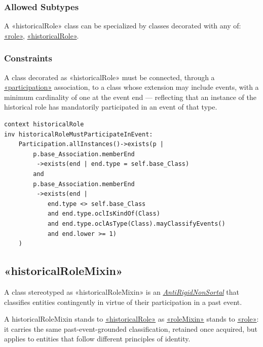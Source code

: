 \subsubsection{Allowed Subtypes}

A «historicalRole» class can be specialized by classes decorated with any of:
\hyperref[stereotype:role]{«role»}, \hyperref[stereotype:historicalRole]{«historicalRole»}.


\subsubsection{Constraints}

\begin{constraint}
\label{constraint:historicalRoleMustParticipateInEvent}

A class decorated as «historicalRole» must be connected, through a \hyperref[stereotype:participation]{«participation»} association, to a class whose extension may include events, with a minimum cardinality of one at the event end --- reflecting that an instance of the historical role has mandatorily participated in an event of that type.

\begin{lstlisting}[language=OCL]
context historicalRole 
inv historicalRoleMustParticipateInEvent:
    Participation.allInstances()->exists(p |
        p.base_Association.memberEnd
         ->exists(end | end.type = self.base_Class)
        and
        p.base_Association.memberEnd
         ->exists(end |
            end.type <> self.base_Class
            and end.type.oclIsKindOf(Class)
            and end.type.oclAsType(Class).mayClassifyEvents()
            and end.lower >= 1)
    )
\end{lstlisting}
\end{constraint}

\subsection{«historicalRoleMixin»}
\label{stereotype:historicalRoleMixin}

A class stereotyped as «historicalRoleMixin» is an \hyperref[stereotype:antiRigidNonSortal]{\textit{AntiRigidNonSortal}} that classifies entities contingently in virtue of their participation in a past event.

A historicalRoleMixin stands to \hyperref[stereotype:historicalRole]{«historicalRole»} as \hyperref[stereotype:roleMixin]{«roleMixin»} stands to \hyperref[stereotype:role]{«role»}: it carries the same past-event-grounded classification, retained once acquired, but applies to entities that follow different principles of identity. 

